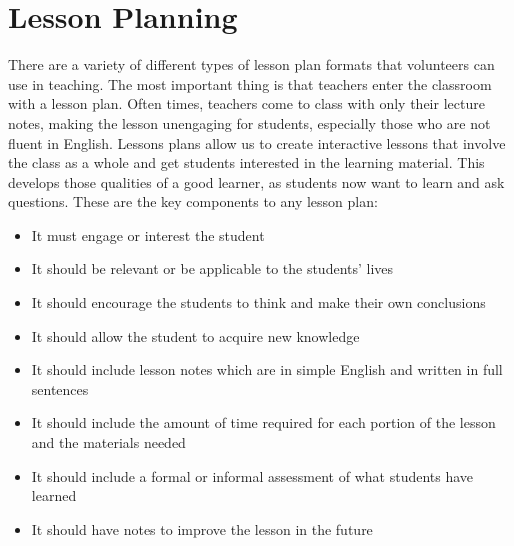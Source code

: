 \chapter{Lesson Planning}
There are a variety of different types of lesson plan formats that volunteers can use in teaching. The most important thing is that teachers enter the classroom with a lesson plan. Often times, teachers come to class with only their lecture notes, making the lesson unengaging for students, especially those who are not fluent in English. Lessons plans allow us to create interactive lessons that involve the class as a whole and get students interested in the learning material. This develops those qualities of a good learner, as students now want to learn and ask questions. These are the key components to any lesson plan:

\begin{itemize}
\item It must engage or interest the student
\item It should be relevant or be applicable to the students' lives
\item It should encourage the students to think and make their own conclusions
\item It should allow the student to acquire new knowledge
\item It should include lesson notes which are in simple English and written in full sentences
\item It should include the amount of time required for each portion of the lesson and the materials needed
\item It should include a formal or informal assessment of what students have learned
\item It should have notes to improve the lesson in the future
\end{itemize}

\begin{figure}[h!]
\centering
\setlength\fboxsep{0pt}
\setlength\fboxrule{2pt}
\end{figure}

